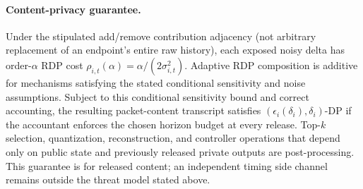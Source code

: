 \documentclass[conference]{IEEEtran}
\begin{document}
\paragraph{Content-privacy guarantee.}
Under the stipulated add/remove contribution adjacency (not arbitrary replacement of an endpoint's entire raw history), each exposed noisy delta
has order-$\alpha$ RDP cost $\rho_{i,t}(\alpha)=\alpha/(2\sigma_{i,t}^2)$.
Adaptive RDP composition is additive for mechanisms satisfying the stated
conditional sensitivity and noise assumptions. Subject to this conditional sensitivity bound and correct accounting, the resulting packet-content
transcript satisfies $(\epsilon_i(\delta_i),\delta_i)$-DP if the
accountant enforces the chosen horizon budget at every release.
Top-$k$ selection, quantization, reconstruction, and controller operations
that depend only on public state and previously released private outputs
are post-processing. This guarantee is for released content; an independent
timing side channel remains outside the threat model stated above.

\endgroup
\vspace{-3mm}
\end{document}
